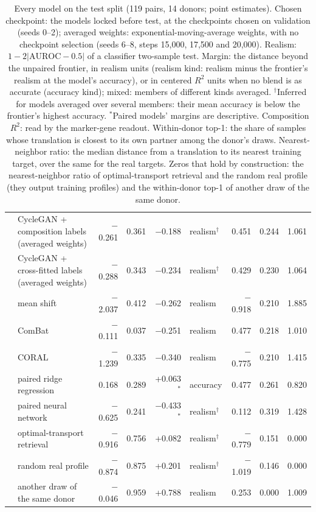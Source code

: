 \begin{table}[t]
\begin{tabular}{llrrrlrrr}
 & CycleGAN + composition labels (averaged weights) & $-$0.261 & 0.361 & $-$0.188 & realism$^{\dagger}$ & 0.451 & 0.244 & 1.061 \\
 & CycleGAN + cross-fitted labels (averaged weights) & $-$0.288 & 0.343 & $-$0.234 & realism$^{\dagger}$ & 0.429 & 0.230 & 1.064 \\
 & mean shift & $-$2.037 & 0.412 & $-$0.262 & realism & $-$0.918 & 0.210 & 1.885 \\
 & ComBat & $-$0.111 & 0.037 & $-$0.251 & realism & 0.477 & 0.218 & 1.010 \\
 & CORAL & $-$1.239 & 0.335 & $-$0.340 & realism & $-$0.775 & 0.210 & 1.415 \\
 & paired ridge regression & 0.168 & 0.289 & +0.063$^{*}$ & accuracy & 0.477 & 0.261 & 0.820 \\
 & paired neural network & $-$0.625 & 0.241 & $-$0.433$^{*}$ & realism$^{\dagger}$ & 0.112 & 0.319 & 1.428 \\
 & optimal-transport retrieval & $-$0.916 & 0.756 & +0.082 & realism$^{\dagger}$ & $-$0.779 & 0.151 & 0.000 \\
 & random real profile & $-$0.874 & 0.875 & +0.201 & realism$^{\dagger}$ & $-$1.019 & 0.146 & 0.000 \\
 & another draw of the same donor & $-$0.046 & 0.959 & +0.788 & realism & 0.253 & 0.000 & 1.009 \\
\bottomrule
\end{tabular}
\caption{Every model on the test split (119 pairs, 14 donors; point estimates). Chosen checkpoint: the models locked before test, at the checkpoints chosen on validation (seeds 0--2); averaged weights: exponential-moving-average weights, with no checkpoint selection (seeds 6--8, steps 15,000, 17,500 and 20,000). Realism: $1 - 2\lvert\mathrm{AUROC} - 0.5\rvert$ of a classifier two-sample test. Margin: the distance beyond the unpaired frontier, in realism units (realism kind: realism minus the frontier's realism at the model's accuracy), or in centered $R^2$ units when no blend is as accurate (accuracy kind); mixed: members of different kinds averaged. $^{\dagger}$Inferred for models averaged over several members: their mean accuracy is below the frontier's highest accuracy. $^{*}$Paired models' margins are descriptive. Composition $R^2$: read by the marker-gene readout. Within-donor top-1: the share of samples whose translation is closest to its own partner among the donor's draws. Nearest-neighbor ratio: the median distance from a translation to its nearest training target, over the same for the real targets. Zeros that hold by construction: the nearest-neighbor ratio of optimal-transport retrieval and the random real profile (they output training profiles) and the within-donor top-1 of another draw of the same donor.}
\label{tab:models}
\end{table}
